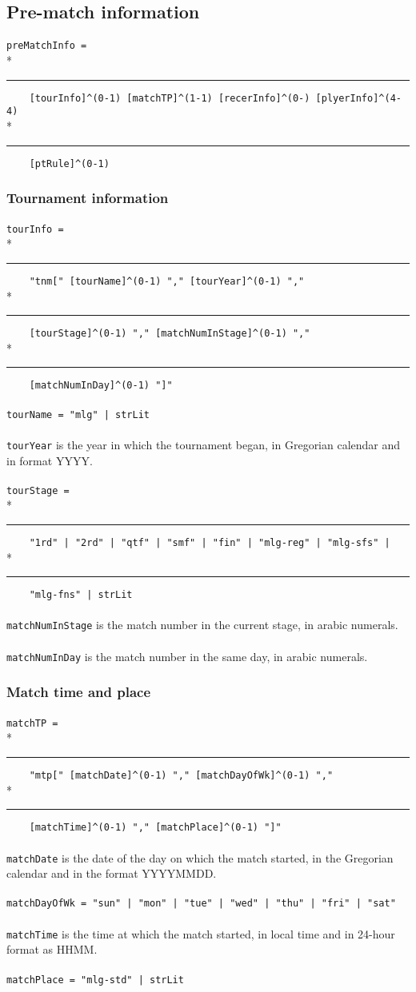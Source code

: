 \documentclass[%
	a4paper%
	,10pt%
	,twoside%
	,notitlepage%
]{article}%
\newcommand*{\ruleSymbol}{\textjapanese{⚠}}%
\newcommand*{\ruleMargin}{\marginpar{\flushright{}\ruleSymbol{}}}%
\newcommand*{\rulePar}{\paragraph*{\ruleMargin{}}}%
\newcommand*{\indentRule}{\rule{10pt}{0pt}}%
\begin{document}
	\subsection{Pre-match information}%
		\rulePar{}\lstinline/preMatchInfo = /\\*{}%
		\indentRule{}\lstinline/    [tourInfo]^(0-1) [matchTP]^(1-1) [recerInfo]^(0-) [plyerInfo]^(4-4) /\\*{}%
		\indentRule{}\lstinline/    [ptRule]^(0-1)/%
		\subsubsection{Tournament information}%
			\rulePar{}\lstinline/tourInfo = /\\*{}%
			\indentRule{}\lstinline/    "tnm[" [tourName]^(0-1) "," [tourYear]^(0-1) "," /\\*{}%
			\indentRule{}\lstinline/    [tourStage]^(0-1) "," [matchNumInStage]^(0-1) "," /\\*{}%
			\indentRule{}\lstinline/    [matchNumInDay]^(0-1) "]"/%
			\rulePar{}\lstinline/tourName = "mlg" | strLit/%
			\rulePar{}\lstinline/tourYear/ is the year in which the tournament began, in Gregorian calendar and in format YYYY. %
			\rulePar{}\lstinline/tourStage = /\\*{}%
			\indentRule{}\lstinline/    "1rd" | "2rd" | "qtf" | "smf" | "fin" | "mlg-reg" | "mlg-sfs" | /\\*{}%
			\indentRule{}\lstinline/    "mlg-fns" | strLit/%
			\rulePar{}\lstinline/matchNumInStage/ is the match number in the current stage, in arabic numerals. %
			\rulePar{}\lstinline/matchNumInDay/ is the match number in the same day, in arabic numerals. %
		\subsubsection{Match time and place}%
			\rulePar{}\lstinline/matchTP = /\\*{}%
			\indentRule{}\lstinline/    "mtp[" [matchDate]^(0-1) "," [matchDayOfWk]^(0-1) "," /\\*{}%
			\indentRule{}\lstinline/    [matchTime]^(0-1) "," [matchPlace]^(0-1) "]"/%
			\rulePar{}\lstinline/matchDate/ is the date of the day on which the match started, in the Gregorian calendar and in the format YYYYMMDD. %
			\rulePar{}\lstinline/matchDayOfWk = "sun" | "mon" | "tue" | "wed" | "thu" | "fri" | "sat"/%
			\rulePar{}\lstinline/matchTime/ is the time at which the match started, in local time and in 24-hour format as HHMM. %
			\rulePar{}\lstinline/matchPlace = "mlg-std" | strLit/%
\end{document}
